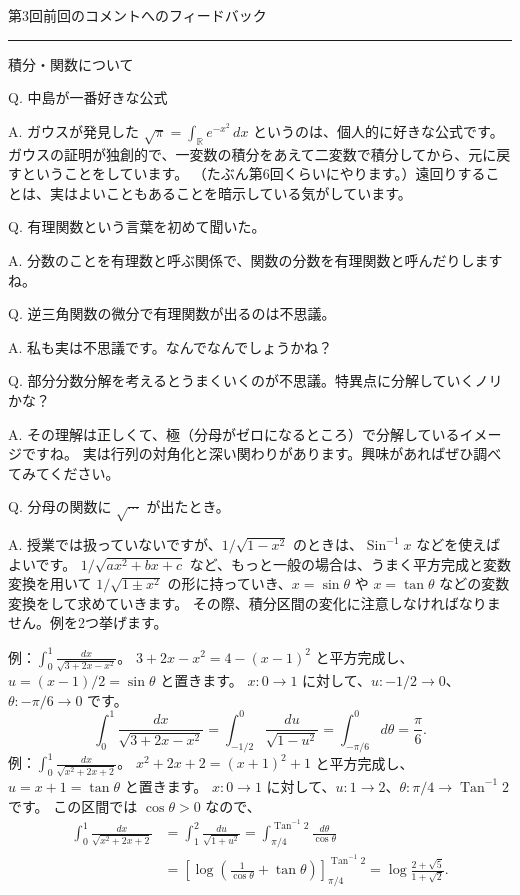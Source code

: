 \documentclass[a4paper,10pt,pdflatex,ja=standard,jafont=ipaex-type1,
  magstyle=real,scale=1]{bxjsarticle}
\newcommand{\coursename}{解析学 II}
\newcommand{\handoutnumber}{3}
\newcommand{\handouttitle}[1]{%
  \begin{center}
    {\Large\color{ink}#1}\par\vspace{3mm}
    {\color{accent}\rule{0.88\linewidth}{0.7pt}}
  \end{center}\vspace{-2mm}}
\newcommand{\handout}[2]{%
  \renewcommand{\handoutnumber}{#1}%
  \handouttitle{第#1回\quad #2}}
\newcommand{\topic}[1]{\par\vspace{5pt}%
  {\large\sffamily\mdseries\color{accent}#1}\par\vspace{2pt}}
\newcommand{\examplelabel}[1]{{\sffamily\mdseries\color{ink}#1}}
\newcommand{\feedback}[2]{%
  \par\addvspace{5pt}\noindent\begin{minipage}{\linewidth}%
  {\color{ink}Q. #1}\par\vspace{1pt}%
  {\color{accent}A. }#2%
  \end{minipage}\par}
\begin{document}
\fontsize{10pt}{13.5pt}\selectfont
\setlength{\abovedisplayskip}{4pt}
\setlength{\belowdisplayskip}{4pt}
\fancyhead[L]{\small\color{ink}\coursename{}・フィードバック}
\handout{3}{前回のコメントへのフィードバック}
\topic{積分・関数について}

\feedback{中島が一番好きな公式}{%
ガウスが発見した $\displaystyle\sqrt{\pi}=\int_{\mathbb R}e^{-x^2}\,dx$ というのは、個人的に好きな公式です。
ガウスの証明が独創的で、一変数の積分をあえて二変数で積分してから、元に戻すということをしています。
（たぶん第6回くらいにやります。）遠回りすることは、実はよいこともあることを暗示している気がしています。
}

\feedback{有理関数という言葉を初めて聞いた。}{%
分数のことを有理数と呼ぶ関係で、関数の分数を有理関数と呼んだりしますね。
}

\feedback{逆三角関数の微分で有理関数が出るのは不思議。}{%
私も実は不思議です。なんでなんでしょうかね？
}

\feedback{部分分数分解を考えるとうまくいくのが不思議。特異点に分解していくノリかな？}{%
その理解は正しくて、極（分母がゼロになるところ）で分解しているイメージですね。
実は行列の対角化と深い関わりがあります。興味があればぜひ調べてみてください。
}

\feedback{分母の関数に $\sqrt{\cdots}$ が出たとき。}{%
授業では扱っていないですが、$1/\sqrt{1-x^2}$ のときは、$\operatorname{Sin}^{-1}x$ などを使えばよいです。
$1/\sqrt{ax^2+bx+c}$ など、もっと一般の場合は、うまく平方完成と変数変換を用いて
$1/\sqrt{1\pm x^2}$ の形に持っていき、$x=\sin\theta$ や $x=\tan\theta$ などの変数変換をして求めていきます。
その際、積分区間の変化に注意しなければなりません。例を2つ挙げます。

\examplelabel{例：$\displaystyle\int_0^1\frac{dx}{\sqrt{3+2x-x^2}}$。}
$3+2x-x^2=4-(x-1)^2$ と平方完成し、$u=(x-1)/2=\sin\theta$ と置きます。
$x:0\to1$ に対して、$u:-1/2\to0$、$\theta:-\pi/6\to0$ です。
$$
 \int_0^1\frac{dx}{\sqrt{3+2x-x^2}}
 =\int_{-1/2}^0\frac{du}{\sqrt{1-u^2}}
 =\int_{-\pi/6}^0d\theta=\frac{\pi}{6}.
$$
\examplelabel{例：$\displaystyle\int_0^1\frac{dx}{\sqrt{x^2+2x+2}}$。}
$x^2+2x+2=(x+1)^2+1$ と平方完成し、$u=x+1=\tan\theta$ と置きます。
$x:0\to1$ に対して、$u:1\to2$、$\theta:\pi/4\to\operatorname{Tan}^{-1}2$ です。
この区間では $\cos\theta>0$ なので、
$$
 \begin{aligned}
 \int_0^1\frac{dx}{\sqrt{x^2+2x+2}}
 &=\int_1^2\frac{du}{\sqrt{1+u^2}}
 =\int_{\pi/4}^{\operatorname{Tan}^{-1}2}\frac{d\theta}{\cos\theta}\\
 &=\left[\log\left(\frac1{\cos\theta}+\tan\theta\right)\right]_{\pi/4}^{\operatorname{Tan}^{-1}2}
 =\log\frac{2+\sqrt5}{1+\sqrt2}.
 \end{aligned}
$$
}
\end{document}
